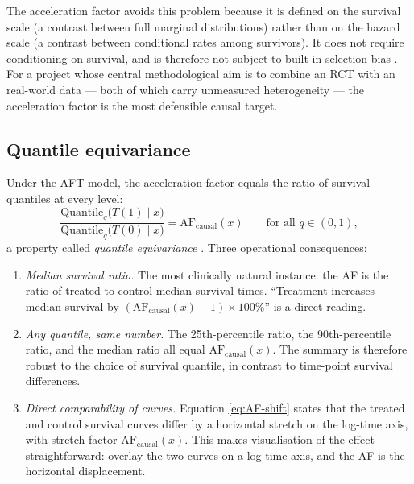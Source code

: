 \documentclass[11pt]{article}
\newcommand{\AF}{\mathrm{AF}}
\begin{document}
The acceleration factor avoids this problem because it is defined on the
survival scale (a contrast between full marginal distributions) rather
than on the hazard scale (a contrast between conditional rates among
survivors). It does not require conditioning on survival, and is therefore
not subject to built-in selection bias \citep{Brathovde2024}. For a
project whose central methodological aim is to combine an RCT with an
real-world data --- both of which carry unmeasured heterogeneity ---
the acceleration factor is the most defensible causal target.

\subsection{Quantile equivariance}

Under the AFT model, the acceleration factor equals the ratio of
survival quantiles at every level:
\begin{equation}
  \frac{\mathrm{Quantile}_{q}\bigl(T(1) \mid x\bigr)}
       {\mathrm{Quantile}_{q}\bigl(T(0) \mid x\bigr)}
  = \AF_{\mathrm{causal}}(x)
  \qquad \text{for all } q \in (0, 1),
\end{equation}
a property called \emph{quantile equivariance} \citep{Wei1992,
Hougaard1999}. Three operational consequences:
\begin{enumerate}[leftmargin=*]
  \item \emph{Median survival ratio.} The most clinically natural
        instance: the AF is the ratio of treated to control median
        survival times. ``Treatment increases median survival by
        $(\AF_{\mathrm{causal}}(x) - 1)\times 100\%$'' is a direct reading.
  \item \emph{Any quantile, same number.} The 25th-percentile ratio, the
        90th-percentile ratio, and the median ratio all equal
        $\AF_{\mathrm{causal}}(x)$. The summary is therefore robust to the
        choice of survival quantile, in contrast to time-point survival
        differences.
  \item \emph{Direct comparability of curves.} Equation
        \eqref{eq:AF-shift} states that the treated and control survival
        curves differ by a horizontal stretch on the log-time axis, with
        stretch factor $\AF_{\mathrm{causal}}(x)$. This makes
        visualisation of the effect straightforward: overlay the two
        curves on a log-time axis, and the AF is the horizontal
        displacement.
\end{enumerate}
\end{document}
